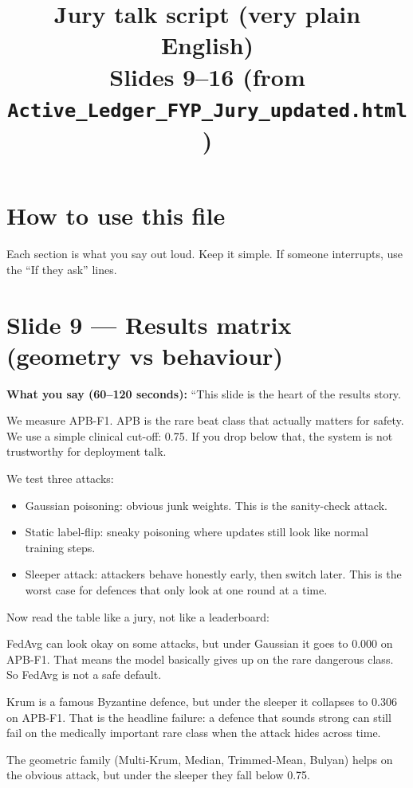\documentclass[11pt,a4paper]{article}
\title{Jury talk script (very plain English)\\Slides 9--16 (from \texttt{Active\_Ledger\_FYP\_Jury\_updated.html})}
\author{}
\date{}
\begin{document}
\maketitle

\section{How to use this file}
Each section is what you say out loud. Keep it simple. If someone interrupts, use the ``If they ask'' lines.

\section{Slide 9 --- Results matrix (geometry vs behaviour)}

\textbf{What you say (60--120 seconds):}
``This slide is the heart of the results story.

We measure APB-F1. APB is the rare beat class that actually matters for safety. We use a simple clinical cut-off: 0.75. If you drop below that, the system is not trustworthy for deployment talk.

We test three attacks:
\begin{itemize}
\item Gaussian poisoning: obvious junk weights. This is the sanity-check attack.
\item Static label-flip: sneaky poisoning where updates still look like normal training steps.
\item Sleeper attack: attackers behave honestly early, then switch later. This is the worst case for defences that only look at one round at a time.
\end{itemize}

Now read the table like a jury, not like a leaderboard:

FedAvg can look okay on some attacks, but under Gaussian it goes to 0.000 on APB-F1. That means the model basically gives up on the rare dangerous class. So FedAvg is not a safe default.

Krum is a famous Byzantine defence, but under the sleeper it collapses to 0.306 on APB-F1. That is the headline failure: a defence that sounds strong can still fail on the medically important rare class when the attack hides across time.

The geometric family (Multi-Krum, Median, Trimmed-Mean, Bulyan) helps on the obvious attack, but under the sleeper they fall below 0.75.
\end{document}
